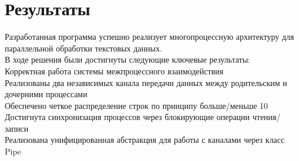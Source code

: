 \section{Результаты}

Разработанная программа успешно реализует многопроцессную архитектуру для параллельной обработки текстовых данных. \\
В ходе решения были достигнуты следующие ключевые результаты:\\
Корректная работа системы межпроцессного взаимодействия\\
Реализованы два независимых канала передачи данных между родительским и дочерними процессами\\
Обеспечено четкое распределение строк по принципу больше/меньше 10\\
Достигнута синхронизация процессов через блокирующие операции чтения/записи\\
Реализована унифицированная абстракция для работы с каналами через класс Pipe\\